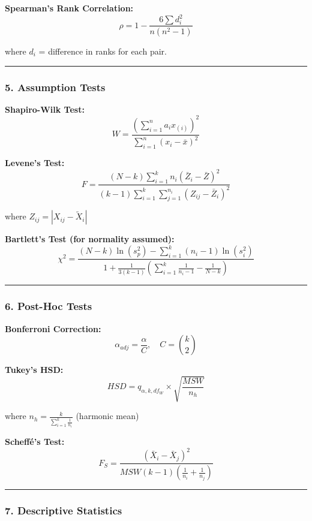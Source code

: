 \documentclass[11pt]{article}
\begin{document}
\textbf{Spearman's Rank Correlation:}
\[\rho = 1 - \frac{6\sum d_i^2}{n(n^2-1)}\]

where \(d_i\) = difference in ranks for each pair.

\begin{center}\rule{0.5\linewidth}{0.5pt}\end{center}

\subsubsection{\texorpdfstring{\textbf{5. Assumption
Tests}}{5. Assumption Tests}}\label{assumption-tests}

\textbf{Shapiro-Wilk Test:}
\[W = \frac{\left(\sum_{i=1}^{n} a_i x_{(i)}\right)^2}{\sum_{i=1}^{n}(x_i - \bar{x})^2}\]

\textbf{Levene's Test:}
\[F = \frac{(N-k)\sum_{i=1}^{k}n_i(\bar{Z}_i - \bar{Z})^2}{(k-1)\sum_{i=1}^{k}\sum_{j=1}^{n_i}(Z_{ij} - \bar{Z}_i)^2}\]

where \(Z_{ij} = |X_{ij} - \tilde{X}_i|\)

\textbf{Bartlett's Test (for normality assumed):}
\[\chi^2 = \frac{(N-k)\ln(s_p^2) - \sum_{i=1}^{k}(n_i-1)\ln(s_i^2)}{1 + \frac{1}{3(k-1)}\left(\sum_{i=1}^{k}\frac{1}{n_i-1} - \frac{1}{N-k}\right)}\]

\begin{center}\rule{0.5\linewidth}{0.5pt}\end{center}

\subsubsection{\texorpdfstring{\textbf{6. Post-Hoc
Tests}}{6. Post-Hoc Tests}}\label{post-hoc-tests}

\textbf{Bonferroni Correction:}
\[\alpha_{adj} = \frac{\alpha}{C}, \quad C = \binom{k}{2}\]

\textbf{Tukey's HSD:}
\[HSD = q_{\alpha, k, df_W} \times \sqrt{\frac{MSW}{n_h}}\]

where \(n_h = \frac{k}{\sum_{i=1}^{k}\frac{1}{n_i}}\) (harmonic mean)

\textbf{Scheffé's Test:}
\[F_S = \frac{(\bar{X}_i - \bar{X}_j)^2}{MSW(k-1)\left(\frac{1}{n_i} + \frac{1}{n_j}\right)}\]

\begin{center}\rule{0.5\linewidth}{0.5pt}\end{center}

\subsubsection{\texorpdfstring{\textbf{7. Descriptive
Statistics}}{7. Descriptive Statistics}}\label{descriptive-statistics}
\end{document}
